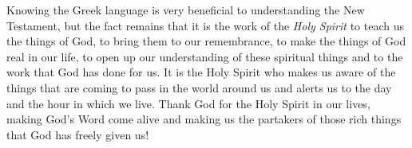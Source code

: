 Knowing the Greek language is very beneficial to understanding the New Testament, but the fact remains that it is 
the work of the \emph{Holy Spirit} to teach us the things of God, to 
bring them to our remembrance, to make the things of God 
real in our life, to open up our understanding of these spiritual things and to the work that God has done for us. It 
is the Holy Spirit who makes us aware of the things that 
are coming to pass in the world around us and alerts us to 
the day and the hour in which we live. Thank God for the 
Holy Spirit in our lives, making God’s Word come alive and 
making us the partakers of those rich things that God has 
freely given us!



